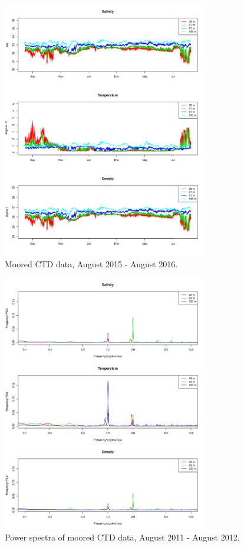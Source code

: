 \documentclass[12pt]{dforeport}
\begin{document}
\begin{figure}
\centering
\includegraphics[width = 0.8\textwidth]{./figures/09_mctd_2015_2016.png}
\caption[Moored CTD, August 2015-2016]{Moored CTD data, August 2015 - August 2016.}
\label{f:mctd_2015_2016}
\end{figure}



\begin{figure}
\centering
\includegraphics[width = 0.8\textwidth]{./figures/10_mctd_ps_2011_2012.png}
\caption[Power spectra of moored CTD, 2011-2012]{Power spectra of moored CTD data, August 2011 - August 2012.}
\label{f:mctd_ps_2011_2012}
\end{figure}
\end{document}
